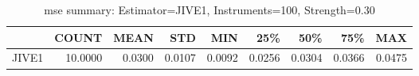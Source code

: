\begin{table}[ht]
\centering
\caption{mse summary: Estimator=JIVE1, Instruments=100, Strength=0.30}
\begin{tabular}{lrrrrrrrr}
\toprule
 & COUNT & MEAN & STD & MIN & 25\% & 50\% & 75\% & MAX \\
\midrule
JIVE1 & 10.0000 & 0.0300 & 0.0107 & 0.0092 & 0.0256 & 0.0304 & 0.0366 & 0.0475 \\
\bottomrule
\end{tabular}
\end{table}

